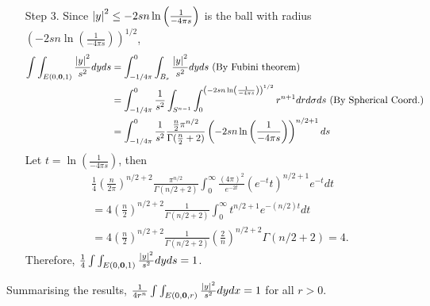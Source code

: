 \documentclass{article}
\begin{document}
\begin{enumerate}
    \item[Step 3.] Since $\abs{y}^2\leq -2sn\ln\left(\frac{1}{-4\pi s}\right)$ is the ball with radius $\left(-2sn\ln\left(\frac{1}{-4\pi s}\right)\right)^{1/2}$, 
    \begin{equation*}
    \begin{split}
        \int\int_{E(0, \bm{0}, 1)} \frac{\abs{y}^2}{s^2}dyds&=\int_{-1/4\pi}^0\int_{B_s}\frac{\abs{y}^2}{s^2}dyds \text{ (By Fubini theorem)}\\
        &=\int_{-1/4\pi}^0 \frac{1}{s^2} \int_{S^{n-1}}\int_0^{\left(-2sn\ln\left(\frac{1}{-4\pi s}\right)\right)^{1/2}} r^{n+1}drd\sigma ds \text{ (By Spherical Coord.)}\\
        &=\int_{-1/4\pi}^0 \frac{1}{s^2}\frac{\frac{n}{2}\pi^{n/2}}{\Gamma(\frac{n}{2}+2)} \left(-2sn\ln\left(\frac{1}{-4\pi s}\right)\right)^{n/2+1} ds
    \end{split}
    \end{equation*}
    Let $t=\ln\left(\frac{1}{-4\pi s}\right)$, then 
    \begin{equation*}
        \begin{split}
            &\frac{1}{4}\left(\frac{n}{2\pi}\right)^{n/2+2}\frac{\pi^{n/2}}{\Gamma(n/2+2)}\int_{0}^\infty \frac{(4\pi)^2}{e^{-2t}} \left(e^{-t}t\right)^{n/2+1} e^{-t}dt \\
            &=4\left(\frac{n}{2}\right)^{n/2+2}\frac{1}{\Gamma(n/2+2)}\int_0^\infty t^{n/2+1}e^{-(n/2)t}dt \\
            &=4\left(\frac{n}{2}\right)^{n/2+2}\frac{1}{\Gamma(n/2+2)}\left(\frac{2}{n}\right)^{n/2+2}\Gamma(n/2+2)=4.
        \end{split}
    \end{equation*}
    Therefore, $\frac{1}{4}\int\int_{E(0, \bm{0}, 1)} \frac{\abs{y}^2}{s^2}dyds=1$.
\end{enumerate}
Summarising the results, $\frac{1}{4r^n}\int \int_{E(0, \bm{0}, r)}\frac{\abs{y}^2}{s^2}dydx=1$ for all $r>0$.
\end{document}
